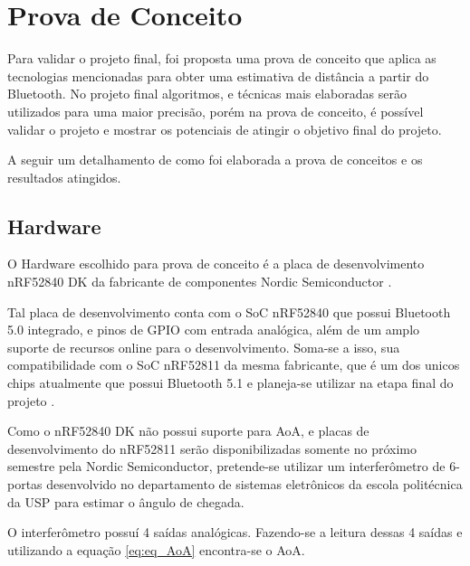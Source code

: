 \chapter{Prova de Conceito}
Para validar o projeto final, foi proposta uma prova de conceito que aplica as tecnologias mencionadas para obter uma estimativa de distância a partir do Bluetooth.
No projeto final algoritmos, e técnicas mais elaboradas serão utilizados para uma maior precisão, porém na prova de conceito, é possível validar o projeto e mostrar os potenciais de atingir o objetivo final do projeto.

A seguir um detalhamento de como foi elaborada a prova de conceitos e os resultados atingidos.

\section{Hardware}
O Hardware escolhido para prova de conceito é a placa de desenvolvimento nRF52840 DK da fabricante de componentes Nordic Semiconductor \cite{nRF52840_site}.

Tal placa de desenvolvimento conta com o SoC nRF52840 que possui Bluetooth 5.0 integrado, e pinos de GPIO com entrada analógica, além de um amplo suporte de recursos online para o desenvolvimento. Soma-se a isso, sua compatibilidade com o SoC nRF52811 da mesma fabricante, que é um dos unicos chips atualmente que possui Bluetooth 5.1 e planeja-se utilizar na etapa final do projeto \cite{nRF52811_site}.

Como o nRF52840 DK não possui suporte para AoA, e placas de desenvolvimento do nRF52811 serão disponibilizadas somente no próximo semestre pela Nordic Semiconductor, pretende-se utilizar um interferômetro de 6-portas desenvolvido no departamento de sistemas eletrônicos da escola politécnica da USP para estimar o ângulo de chegada.

O interferômetro possuí 4 saídas analógicas. Fazendo-se a leitura dessas 4 saídas e utilizando a equação \ref{eq:eq_AoA} encontra-se o AoA.


